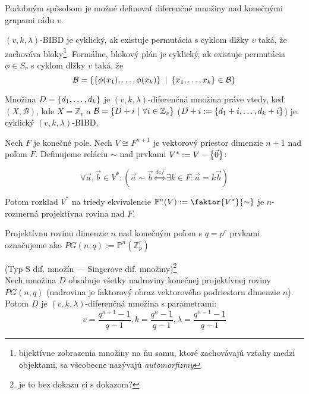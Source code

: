 \begin{remark}

Podobným spôsobom je možné definovať diferenčné množiny nad konečnými grupami rádu $v$.

\end{remark}

\begin{definition}
$(v, k, \lambda)$-BIBD je cyklický, ak existuje permutácia s cyklom dlžky $v$ taká, že zachováva bloky\footnote{
bijektívne zobrazenia množiny na ňu samu, ktoré zachovávajú vzťahy medzi objektami, sa všeobecne nazývajú \emph{automorfizmy}}. 
Formálne, blokový plán je cyklický, ak 
existuje permutácia  $\phi \in S_v$ s cyklom dlžky $v$ taká, že 
$$\mathcal{B} = \left\{\left\{\phi(x_1), \ldots, \phi(x_k)\right\} ~|~ \left\{x_1, \ldots, x_k\right\} \in \mathcal{B} \right\}$$
\end{definition}

\begin{theorem}
Množina $D = \left\{d_1, \ldots, d_k\right\}$ je $(v, k, \lambda)$-diferenčná množina práve vtedy, keď
$(X, \mathcal{B})$, kde $X = \mathbb{Z}_v$ a $\mathcal{B} = \left\{D + i ~|~ \forall i \in \mathbb{Z}_v\right\}$ ($D + i := \left\{d_1 + i, \ldots, d_k + i\right\}$)
je cyklický $(v, k, \lambda)$-BIBD. 
\end{theorem}

\begin{definition}
\label{def:fpp1}
Nech $F$ je konečné pole. Nech $V \cong F^{n+1}$ je vektorový priestor dimenzie $n+1$ nad poľom $F$. 
Definujeme reláciu $\sim$ nad prvkami $V^* := V - \left\{\vec{0}\right\}$:

$$\forall \vec{a},\vec{b} \in V^*: \left( \vec{a} \sim \vec{b} \overset{def}{\Longleftrightarrow} \exists k \in F: \vec{a} = k \vec{b} \right)$$

Potom rozklad $V^*$ na triedy ekvivalencie $\mathbb{P}^n(V) := \faktor{V^*}{\sim}$ je $n$-rozmerná projektívna rovina nad $F$.

Projektívnu rovinu dimenzie $n$ nad konečným poľom s $q = p^r$ prvkami označujeme ako $PG(n, q) := \mathbb{P}^n\left( \mathbb{Z}_p^r \right)$

\end{definition}

\begin{theorem_hard}{(Typ S dif. množín --- Singerove dif. množiny)\footnote{\TODO je to bez dokazu ci s dokazom?}}\\
Nech množina $D$ obsahuje všetky nadroviny konečnej projektívnej roviny $PG(n, q)$ 
(nadrovina je faktorový obraz vektorového podriestoru dimenzie $n$). 
Potom $D$ je $(v, k, \lambda)$-diferenčná množina s parametrami:
$$v = \dfrac{q^{n+1}-1}{q-1}, k = \dfrac{q^n - 1}{q-1}, \lambda = \dfrac{q^{n-1}-1}{q-1}$$
\end{theorem_hard}

